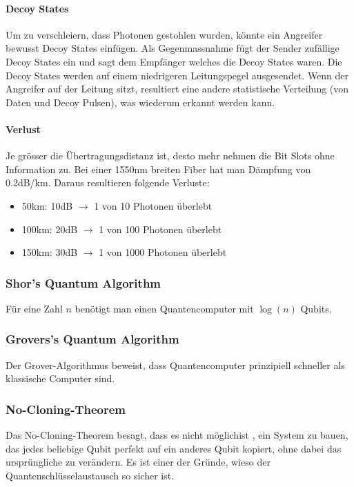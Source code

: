 \paragraph{Decoy States}
Um zu verschleiern, dass Photonen gestohlen wurden, könnte ein Angreifer bewusst Decoy States einfügen. Als Gegenmassnahme fügt der Sender zufällige Decoy States ein und sagt dem Empfänger welches die Decoy States waren. Die Decoy States werden auf einem niedrigeren Leitungspegel ausgesendet. Wenn der Angreifer auf der Leitung sitzt, resultiert eine andere statistische Verteilung (von Daten und Decoy Pulsen), was wiederum erkannt werden kann.


\paragraph{Verlust}
Je grösser die Übertragungsdistanz  ist, desto mehr nehmen die Bit Slots ohne Information zu. Bei einer 1550nm breiten Fiber hat man Dämpfung von 0.2dB/km. Daraus resultieren folgende Verluste:
\begin{itemize}
	\item 50km: 10dB $\rightarrow$ 1 von 10 Photonen überlebt
	\item 100km: 20dB $\rightarrow$ 1 von 100 Photonen überlebt
	\item 150km: 30dB $\rightarrow$ 1 von 1000 Photonen überlebt
\end{itemize}

\subsubsection{Shor's Quantum Algorithm}
Für eine Zahl $n$ benötigt man einen Quantencomputer mit $\log(n)$ Qubits. 

\subsubsection{Grovers's Quantum Algorithm}
Der Grover-Algorithmus beweist, dass Quantencomputer prinzipiell schneller als klassische Computer sind. 

\subsubsection{No-Cloning-Theorem}
Das No-Cloning-Theorem besagt, dass es nicht möglichist , ein System zu bauen, das jedes beliebige Qubit perfekt auf ein anderes Qubit kopiert, ohne dabei das ursprüngliche zu verändern. Es ist einer der Gründe, wieso der Quantenschlüsselaustausch so sicher ist.

